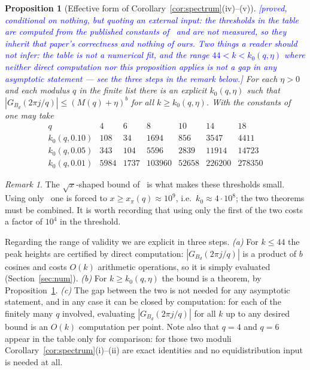 \documentclass[11pt,a4paper]{article}
\theoremstyle{plain}
\newtheorem{proposition}[theorem]{Proposition}
\theoremstyle{definition}
\theoremstyle{remark}
\newtheorem{remark}[theorem]{Remark}
\newcommand{\STATUS}[1]{\textcolor{blue}{\textsf{[#1]}}}
\begin{document}
\begin{proposition}[Effective form of Corollary~\ref{cor:spectrum}(iv)--(v)]
\label{prop:l5a}
\STATUS{proved, conditional on nothing, but quoting an external input: the thresholds in the
table are \emph{computed} from the published constants of~\cite{BMOR18} and are not measured,
so they inherit that paper's correctness and nothing of ours. Two things a reader should not
infer: the table is not a numerical fit, and the range $44<k<k_0(q,\eta)$ where neither direct
computation nor this proposition applies is not a gap in any asymptotic statement --- see the
three steps in the remark below.}
For each $\eta>0$ and each modulus $q$ in the finite list there is an explicit
$k_0(q,\eta)$ such that $|G_{B_d}(2\pi j/q)|\le(M(q)+\eta)^{b}$ for all
$k\ge k_0(q,\eta)$. With the constants of~\cite{BMOR18} one may take
\[
  \begin{array}{c|cccccc}
    q & 4 & 6 & 8 & 10 & 14 & 18\\\hline
    k_0(q,0.10) & 108 & 34 & 1694 & 856 & 3547 & 4411\\
    k_0(q,0.05) & 343 & 104 & 5596 & 2839 & 11914 & 14723\\
    k_0(q,0.01) & 5984 & 1737 & 103960 & 52658 & 226200 & 278350
  \end{array}
\]
\end{proposition}

\begin{remark}
The $\sqrt{x}$-shaped bound of~\cite[Thm.~1.9]{BMOR18} is what makes these
thresholds small. Using only~\cite[Thm.~1.3]{BMOR18} one is forced to
$x\ge x_\pi(q)\approx10^{9}$, i.e.\ $k_0\approx4\cdot10^{8}$; the two theorems
must be combined. It is worth recording that using only the first of the two
costs a factor of $10^{4}$ in the threshold.

Regarding the range of validity we are explicit in three steps.
\emph{(a)} For $k\le44$ the peak heights are certified by direct computation:
$|G_{B_d}(2\pi j/q)|$ is a product of $b$ cosines and costs $O(k)$ arithmetic
operations, so it is simply evaluated (Section~\ref{sec:num}).
\emph{(b)} For $k\ge k_0(q,\eta)$ the bound is a theorem, by
Proposition~\ref{prop:l5a}.
\emph{(c)} The gap between the two is not needed for any asymptotic statement,
and in any case it can be closed by computation: for each of the finitely many
$q$ involved, evaluating $|G_{B_d}(2\pi j/q)|$ for all $k$ up to any desired
bound is an $O(k)$ computation per point.
Note also that $q=4$ and $q=6$ appear in the table only for comparison: for those
two moduli Corollary~\ref{cor:spectrum}(i)--(ii) are exact identities and no
equidistribution input is needed at all.
\end{remark}
\end{document}
